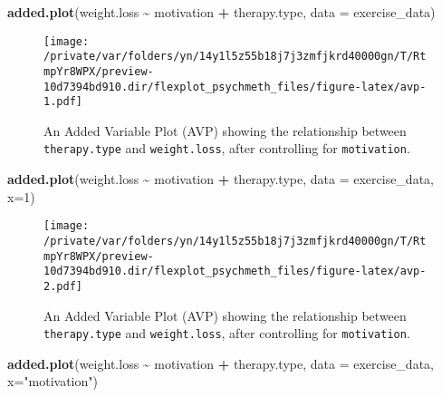 \documentclass[
  english,
  man]{apa6}
\newenvironment{Shaded}{\begin{snugshade}}{\end{snugshade}}
\newcommand{\DataTypeTok}[1]{\textcolor[rgb]{0.13,0.29,0.53}{#1}}
\newcommand{\DecValTok}[1]{\textcolor[rgb]{0.00,0.00,0.81}{#1}}
\newcommand{\KeywordTok}[1]{\textcolor[rgb]{0.13,0.29,0.53}{\textbf{#1}}}
\newcommand{\NormalTok}[1]{#1}
\newcommand{\OperatorTok}[1]{\textcolor[rgb]{0.81,0.36,0.00}{\textbf{#1}}}
\newcommand{\StringTok}[1]{\textcolor[rgb]{0.31,0.60,0.02}{#1}}
\begin{document}
\small

\begin{Shaded}
\begin{Highlighting}[]
\KeywordTok{added.plot}\NormalTok{(weight.loss }\OperatorTok{\textasciitilde{}}\StringTok{ }\NormalTok{motivation }\OperatorTok{+}\StringTok{ }\NormalTok{therapy.type, }\DataTypeTok{data =}\NormalTok{ exercise\_data)}
\end{Highlighting}
\end{Shaded}

\begin{figure}
\centering
\texttt{[image: /private/var/folders/yn/14y1l5z55b18j7j3zmfjkrd40000gn/T/RtmpYr8WPX/preview-10d7394bd910.dir/flexplot\_psychmeth\_files/figure-latex/avp-1.pdf]}
\caption{\label{fig:avp-1}An Added Variable Plot (AVP) showing the relationship between \texttt{therapy.type} and \texttt{weight.loss}, after controlling for \texttt{motivation}. \label{fig:avp}}
\end{figure}

\begin{Shaded}
\begin{Highlighting}[]
\KeywordTok{added.plot}\NormalTok{(weight.loss }\OperatorTok{\textasciitilde{}}\StringTok{ }\NormalTok{motivation }\OperatorTok{+}\StringTok{ }\NormalTok{therapy.type, }\DataTypeTok{data =}\NormalTok{ exercise\_data, }\DataTypeTok{x=}\DecValTok{1}\NormalTok{) }
\end{Highlighting}
\end{Shaded}

\begin{figure}
\centering
\texttt{[image: /private/var/folders/yn/14y1l5z55b18j7j3zmfjkrd40000gn/T/RtmpYr8WPX/preview-10d7394bd910.dir/flexplot\_psychmeth\_files/figure-latex/avp-2.pdf]}
\caption{\label{fig:avp-2}An Added Variable Plot (AVP) showing the relationship between \texttt{therapy.type} and \texttt{weight.loss}, after controlling for \texttt{motivation}. \label{fig:avp}}
\end{figure}

\begin{Shaded}
\begin{Highlighting}[]
\KeywordTok{added.plot}\NormalTok{(weight.loss }\OperatorTok{\textasciitilde{}}\StringTok{ }\NormalTok{motivation }\OperatorTok{+}\StringTok{ }\NormalTok{therapy.type, }\DataTypeTok{data =}\NormalTok{ exercise\_data, }\DataTypeTok{x=}\StringTok{"motivation"}\NormalTok{) }
\end{Highlighting}
\end{Shaded}
\end{document}
